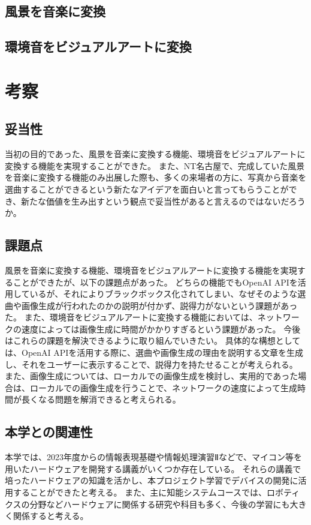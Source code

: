 \section{風景を音楽に変換}

\section{環境音をビジュアルアートに変換}


\chapter{考察}
\section{妥当性}
当初の目的であった、風景を音楽に変換する機能、環境音をビジュアルアートに変換する機能を実現することができた。
また、NT名古屋で、完成していた風景を音楽に変換する機能のみ出展した際も、多くの来場者の方に、写真から音楽を選曲することができるという新たなアイデアを面白いと言ってもらうことができ、新たな価値を生み出すという観点で妥当性があると言えるのではないだろうか。

\section{課題点}
風景を音楽に変換する機能、環境音をビジュアルアートに変換する機能を実現することができたが、以下の課題点があった。
どちらの機能でもOpenAI APIを活用しているが、それによりブラックボックス化されてしまい、なぜそのような選曲や画像生成が行われたのかの説明が付かず、説得力がないという課題があった。
また、環境音をビジュアルアートに変換する機能においては、ネットワークの速度によっては画像生成に時間がかかりすぎるという課題があった。
今後はこれらの課題を解決できるように取り組んでいきたい。
具体的な構想としては、OpenAI APIを活用する際に、選曲や画像生成の理由を説明する文章を生成し、それをユーザーに表示することで、説得力を持たせることが考えられる。
また、画像生成については、ローカルでの画像生成を検討し、実用的であった場合は、ローカルでの画像生成を行うことで、ネットワークの速度によって生成時間が長くなる問題を解消できると考えられる。

\section{本学との関連性}
本学では、2023年度からの情報表現基礎や情報処理演習Ⅱなどで、マイコン等を用いたハードウェアを開発する講義がいくつか存在している。
それらの講義で培ったハードウェアの知識を活かし、本プロジェクト学習でデバイスの開発に活用することができたと考える。
また、主に知能システムコースでは、ロボティクスの分野などハードウェアに関係する研究や科目も多く、今後の学習にも大きく関係すると考える。


